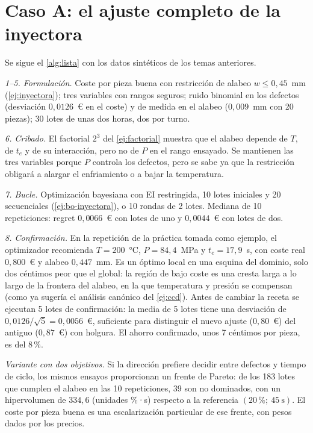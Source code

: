 \section{Caso A: el ajuste completo de la inyectora}

\begin{ejemplo}\label{ej:casoA}
Se sigue el \cref{alg:lista} con los datos sintéticos de los temas anteriores.

\emph{1–5. Formulación.} Coste por pieza buena con restricción de alabeo $w\le0{,}45$~mm (\cref{ej:inyectora}); tres variables con rangos seguros; ruido binomial en los defectos (desviación $0{,}0126$~€ en el coste) y de medida en el alabeo ($0{,}009$~mm con 20 piezas); 30 lotes de unas dos horas, dos por turno.

\emph{6. Cribado.} El factorial $2^3$ del \cref{ej:factorial} muestra que el alabeo depende de $T$, de $t_e$ y de su interacción, pero no de $P$ en el rango ensayado. Se mantienen las tres variables porque $P$ controla los defectos, pero se sabe ya que la restricción obligará a alargar el enfriamiento o a bajar la temperatura.

\emph{7. Bucle.} Optimización bayesiana con EI restringida, 10 lotes iniciales y 20 secuenciales (\cref{ej:bo-inyectora}), o 10 rondas de 2 lotes. Mediana de 10 repeticiones: regret $0{,}0066$~€ con lotes de uno y $0{,}0044$~€ con lotes de dos.

\emph{8. Confirmación.} En la repetición de la práctica tomada como ejemplo, el optimizador recomienda $T=200$~°C, $P=84{,}4$~MPa y $t_e=17{,}9$~s, con coste real $0{,}800$~€ y alabeo $0{,}447$~mm. Es un óptimo local en una esquina del dominio, solo dos céntimos peor que el global: la región de bajo coste es una cresta larga a lo largo de la frontera del alabeo, en la que temperatura y presión se compensan (como ya sugería el análisis canónico del \cref{ej:ccd}). Antes de cambiar la receta se ejecutan 5 lotes de confirmación: la media de 5 lotes tiene una desviación de $0{,}0126/\sqrt5=0{,}0056$~€, suficiente para distinguir el nuevo ajuste ($0{,}80$~€) del antiguo ($0{,}87$~€) con holgura. El ahorro confirmado, unos 7 céntimos por pieza, es del $8\,\%$.

\emph{Variante con dos objetivos.} Si la dirección prefiere decidir entre defectos y tiempo de ciclo, los mismos ensayos proporcionan un frente de Pareto: de los 183 lotes que cumplen el alabeo en las 10 repeticiones, 39 son no dominados, con un hipervolumen de $334{,}6$ (unidades \%·s) respecto a la referencia $(20\,\%;\ 45\ \text{s})$. El coste por pieza buena es una escalarización particular de ese frente, con pesos dados por los precios.
\end{ejemplo}

